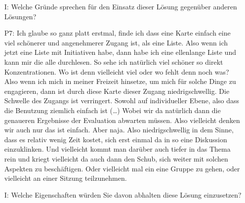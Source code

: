 \begin{itemize}
Erkenntisgewinn entwickeln. (\dots) Achso, und was mir gerade noch einf{\"a}llt. Auf den konkreten Tag bezogen, da ist die Karte nat{\"u}rlich auch sehr sch{\"o}n, um Aktionen die nur an dem Tag stattfinden hervorzuheben. Vielleicht dass man da noch eine weitere Farbe einf{\"u}gt f{\"u}r Aktionen an dem Tag. Weil die Idee ist ja auch an dem Tag, dass dieser nicht nur zentral organisiert wird, sondern auch da ist die Idee, dass die B{\"u}rger direkt partizipieren und selbst Aktionen anbieten. Oft l{\"a}uft das ja {\"u}ber so eine nachbarschaftliche Verbindung, dass da sich Beispielsweise in einem Hinterhof irgendwer etwas {\"u}berlegt hat. Und das sollen die dann da auch in die Karte mit eintragen. Das w{\"a}re dann ja eine M{\"o}glichkeit f{\"u}r die B{\"u}rger diesen Tag, oder den Ablauf des Tages, dezentral zu planen. Das ist auch so eine Sache, die ich mir da f{\"u}r den konkreten Tag verspreche. Das f{\"a}nde ich auch eine gute Funktion.
    \item[I:] Welche Gr{\"u}nde sprechen f{\"u}r den Einsatz dieser L{\"o}sung gegen{\"u}ber anderen L{\"o}sungen?
    \item[P7:] Ich glaube so ganz platt erstmal, finde ich dass eine Karte einfach eine viel sch{\"o}nerer und angenehmerer Zugang ist, als eine Liste. Also wenn ich jetzt eine Liste mit Initiativen habe, dann habe ich eine ellenlange Liste und kann mir die alle durchlesen. So sehe ich nat{\"u}rlich viel sch{\"o}ner so direkt Konzentrationen. Wo ist denn vielleicht viel oder wo fehlt denn noch was? Also wenn ich mich in meiner Freizeit hinsetze, um mich f{\"u}r solche Dinge zu engagieren, dann ist durch diese Karte dieser Zugang niedrigschwellig. Die Schwelle des Zugangs ist verringert. Sowohl auf individueller Ebene, also dass die Benutzung ziemlich einfach ist (\dots) Wobei wir da nat{\"u}rlich dann die genaueren Ergebnisse der Evaluation abwarten m{\"u}ssen. Also vielleicht denken wir auch nur das ist einfach. Aber naja. Also niedrigschwellig in dem Sinne, dass es relativ wenig Zeit kostet, sich erst einmal da in so eine Diskussion einzuklinken. Und vielleicht kommt man dar{\"u}ber auch tiefer in das Thema rein und kriegt vielleicht da auch dann den Schub, sich weiter mit solchen Aspekten zu besch{\"a}ftigen. Oder vielleicht mal ein eine Gruppe zu gehen, oder vielleicht an einer Sitzung teilzunehmen.
    \item[I:] Welche Eigenschaften w{\"u}rden Sie davon abhalten diese L{\"o}sung einzusetzen?

\end{itemize}
